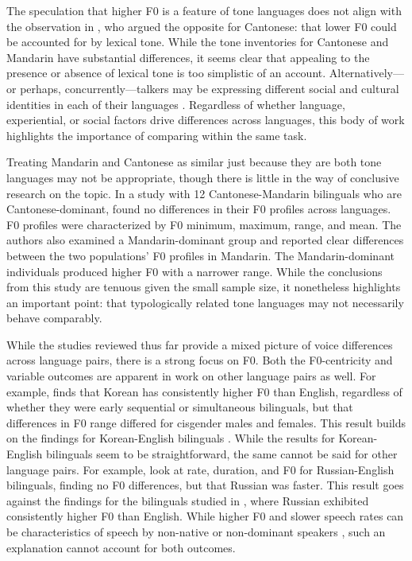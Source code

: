 The speculation that higher F0 is a feature of tone languages does not align with the observation in \citet{ng_2012_ltas}, who argued the opposite for Cantonese: that lower F0 could be accounted for by lexical tone. While the tone inventories for Cantonese and Mandarin have substantial differences, it seems clear that appealing to the presence or absence of lexical tone is too simplistic of an account. Alternatively---or perhaps, concurrently---talkers may be expressing different social and cultural identities in each of their languages \citep{loveday_1981_pitch, voigt_2016_between}. Regardless of whether language, experiential, or social factors drive differences across languages, this body of work highlights the importance of comparing within the same task.

Treating Mandarin and Cantonese as similar just because they are both tone languages may not be appropriate, though there is little in the way of conclusive research on the topic. In a study with 12 Cantonese-Mandarin bilinguals who are Cantonese-dominant, \citet{yang_2020_f0} found no differences in their F0 profiles across languages. F0 profiles were characterized by F0 minimum, maximum, range, and mean. The authors also examined a Mandarin-dominant group and reported clear differences between the two populations' F0 profiles in Mandarin. The Mandarin-dominant individuals produced higher F0 with a narrower range. While the conclusions from this study are tenuous given the small sample size, it nonetheless highlights an important point: that typologically related tone languages may not necessarily behave comparably.

While the studies reviewed thus far provide a mixed picture of voice differences across language pairs, there is a strong focus on F0. Both the F0-centricity and variable outcomes are apparent in work on other language pairs as well. For example, \citet{cheng_2020_f0} finds that Korean has consistently higher F0 than English, regardless of whether they were early sequential or simultaneous bilinguals, but that differences in F0 range differed for cisgender males and females. This result builds on the findings for Korean-English bilinguals \citep{lee_2017_bilingual}. While the results for Korean-English bilinguals seem to be straightforward, the same cannot be said for other language pairs. For example, \citet{ryabov_2016_self} look at rate, duration, and F0 for Russian-English bilinguals, finding no F0 differences, but that Russian was faster. This result goes against the findings for the bilinguals studied in \citet{altenberg_2006_f0}, where Russian exhibited consistently higher F0 than English. While higher F0 and slower speech rates can be characteristics of speech by non-native or non-dominant speakers \citep{jarvinen_2013_speaking}, such an explanation cannot account for both outcomes. 

